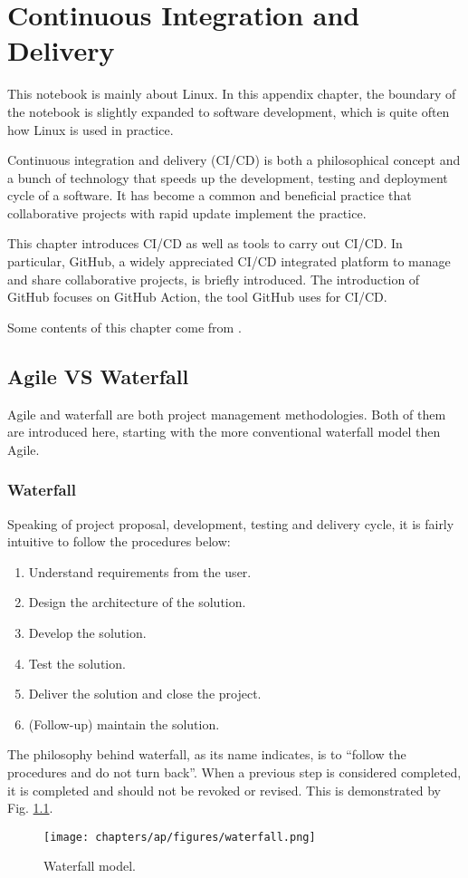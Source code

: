 \chapter{Continuous Integration and Delivery} \label{ch:cicd}

This notebook is mainly about Linux. In this appendix chapter, the boundary of the notebook is slightly expanded to software development, which is quite often how Linux is used in practice.

Continuous integration and delivery (CI/CD) is both a philosophical concept and a bunch of technology that speeds up the development, testing and deployment cycle of a software. It has become a common and beneficial practice that collaborative projects with rapid update implement the practice.

This chapter introduces CI/CD as well as tools to carry out CI/CD. In particular, GitHub, a widely appreciated CI/CD integrated platform to manage and share collaborative projects, is briefly introduced. The introduction of GitHub focuses on GitHub Action, the tool GitHub uses for CI/CD.

Some contents of this chapter come from \cite{honai2023cicd}.

\section{Agile VS Waterfall}

Agile and waterfall are both project management methodologies. Both of them are introduced here, starting with the more conventional waterfall model then Agile.

\subsection{Waterfall}

Speaking of project proposal, development, testing and delivery cycle, it is fairly intuitive to follow the procedures below:
\begin{enumerate}
	\item Understand requirements from the user.
	\item Design the architecture of the solution.
	\item Develop the solution.
	\item Test the solution.
	\item Deliver the solution and close the project.
	\item (Follow-up) maintain the solution.
\end{enumerate}
The philosophy behind waterfall, as its name indicates, is to ``follow the procedures and do not turn back''. When a previous step is considered completed, it is completed and should not be revoked or revised. This is demonstrated by Fig. \ref{ch:cicd:fig:waterfall}.
\begin{figure}[htbp]
	\centering
	\texttt{[image: chapters/ap/figures/waterfall.png]}
	\caption{Waterfall model.} \label{ch:cicd:fig:waterfall}
\end{figure}

